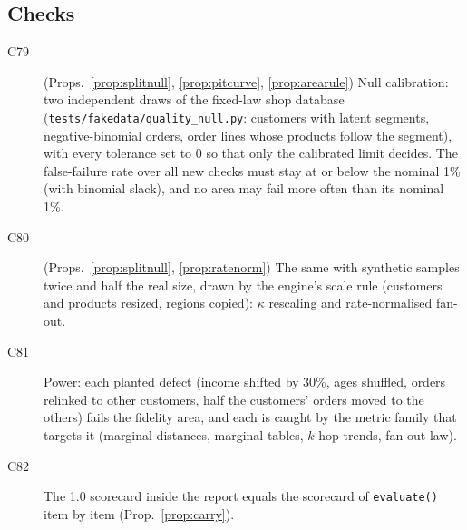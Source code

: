 \subsection{Checks}
\begin{description}
\item[C79] (Props.~\ref{prop:splitnull}, \ref{prop:pitcurve}, \ref{prop:arearule}) Null calibration: two independent draws of the fixed-law shop database (\texttt{tests/fakedata/quality\_null.py}: customers with latent segments, negative-binomial orders, order lines whose products follow the segment), with every tolerance set to $0$ so that only the calibrated limit decides. The false-failure rate over all new checks must stay at or below the nominal 1\% (with binomial slack), and no area may fail more often than its nominal 1\%.
\item[C80] (Props.~\ref{prop:splitnull}, \ref{prop:ratenorm}) The same with synthetic samples twice and half the real size, drawn by the engine's scale rule (customers and products resized, regions copied): $\kappa$ rescaling and rate-normalised fan-out.
\item[C81] Power: each planted defect (income shifted by 30\%, ages shuffled, orders relinked to other customers, half the customers' orders moved to the others) fails the fidelity area, and each is caught by the metric family that targets it (marginal distances, marginal tables, $k$-hop trends, fan-out law).
\item[C82] The 1.0 scorecard inside the report equals the scorecard of \texttt{evaluate()} item by item (Prop.~\ref{prop:carry}).
\end{description}
